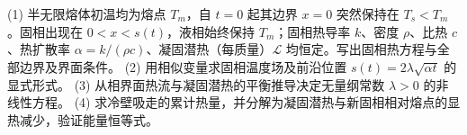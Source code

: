 (1) 半无限熔体初温均为熔点 \(T_m\)，自 \(t=0\) 起其边界 \(x=0\) 突然保持在 \(T_s<T_m\)。固相出现在 \(0<x<s(t)\)，液相始终保持 \(T_m\)；固相热导率 \(k\)、密度 \(\rho\)、比热 \(c\)、热扩散率 \(\alpha=k/(\rho c)\)、凝固潜热（每质量）\(\mathcal L\) 均恒定。写出固相热方程与全部边界及界面条件。
(2) 用相似变量求固相温度场及前沿位置 \(s(t)=2\lambda\sqrt{\alpha t}\) 的显式形式。
(3) 从相界面热流与凝固潜热的平衡推导决定无量纲常数 \(\lambda>0\) 的非线性方程。
(4) 求冷壁吸走的累计热量，并分解为凝固潜热与新固相相对熔点的显热减少，验证能量恒等式。
